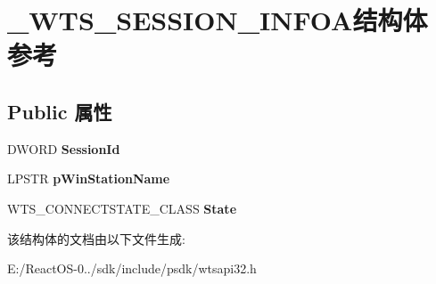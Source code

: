 \hypertarget{struct___w_t_s___s_e_s_s_i_o_n___i_n_f_o_a}{}\section{\+\_\+\+W\+T\+S\+\_\+\+S\+E\+S\+S\+I\+O\+N\+\_\+\+I\+N\+F\+O\+A结构体 参考}
\label{struct___w_t_s___s_e_s_s_i_o_n___i_n_f_o_a}
\subsection*{Public 属性}
\begin{DoxyCompactItemize}
\item 
\mbox{\label{struct___w_t_s___s_e_s_s_i_o_n___i_n_f_o_a_a8916cc574599f2250ca4209405480189}} 
D\+W\+O\+RD {\bfseries Session\+Id}
\item 
\mbox{\label{struct___w_t_s___s_e_s_s_i_o_n___i_n_f_o_a_acb8b9b27f177aeb9b7f75abed73a8bfd}} 
L\+P\+S\+TR {\bfseries p\+Win\+Station\+Name}
\item 
\mbox{\label{struct___w_t_s___s_e_s_s_i_o_n___i_n_f_o_a_abc912c8538a9f2801e98e94377fb525d}} 
W\+T\+S\+\_\+\+C\+O\+N\+N\+E\+C\+T\+S\+T\+A\+T\+E\+\_\+\+C\+L\+A\+SS {\bfseries State}
\end{DoxyCompactItemize}


该结构体的文档由以下文件生成\+:\begin{DoxyCompactItemize}
\item 
E\+:/\+React\+O\+S-\/0../sdk/include/psdk/wtsapi32.\+h\end{DoxyCompactItemize}
